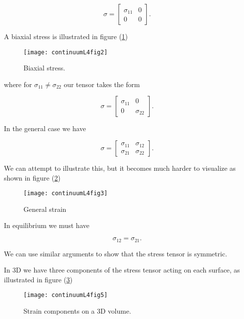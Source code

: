 \begin{equation}\label{eqn:continuumL4:30}
\sigma = 
\begin{bmatrix}
\sigma_{11} & 0 \\
0 & 0
\end{bmatrix}.
\end{equation}

A biaxial stress is illustrated in figure (\ref{fig:continuumL4:continuumL4fig2})
\begin{figure}[htp]
   \centering
   \texttt{[image: continuumL4fig2]}
   \caption{Biaxial stress.}\label{fig:continuumL4:continuumL4fig2}
\end{figure}

where for $\sigma_{11} \ne \sigma_{22}$ our tensor takes the form

\begin{equation}\label{eqn:continuumL4:50}
\sigma = 
\begin{bmatrix}
\sigma_{11} & 0 \\
0 & \sigma_{22}
\end{bmatrix}.
\end{equation}

In the general case we have

\begin{equation}\label{eqn:continuumL4:70}
\sigma = 
\begin{bmatrix}
\sigma_{11} & \sigma_{12} \\
\sigma_{21} & \sigma_{22}
\end{bmatrix}.
\end{equation}

We can attempt to illustrate this, but it becomes much harder to visualize as shown in figure (\ref{fig:continuumL4:continuumL4fig3})
\begin{figure}[htp]
   \centering
   \texttt{[image: continuumL4fig3]}
   \caption{General strain}\label{fig:continuumL4:continuumL4fig3}
\end{figure}

In equilibrium we must have

\begin{equation}\label{eqn:continuumL4:90}
\sigma_{12} = \sigma_{21}.
\end{equation}

We can use similar arguments to show that the stress tensor is symmetric.

In 3D we have three components of the stress tensor acting on each surface, as illustrated in figure (\ref{fig:continuumL4:continuumL4fig5})
\begin{figure}[htp]
   \centering
   \texttt{[image: continuumL4fig5]}
   \caption{Strain components on a 3D volume.}\label{fig:continuumL4:continuumL4fig5}
\end{figure}

